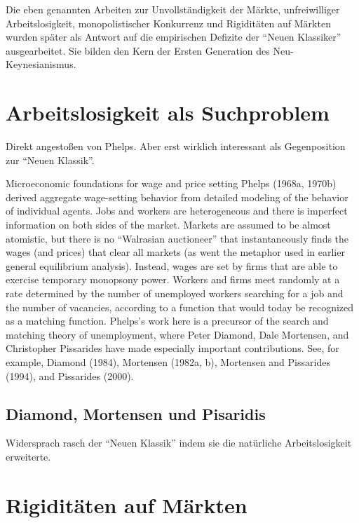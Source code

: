 Die eben genannten Arbeiten zur Unvollständigkeit der Märkte, unfreiwilliger Arbeitslosigkeit, monopolistischer Konkurrenz und Rigiditäten auf Märkten wurden später als Antwort auf die empirischen Defizite der "`Neuen Klassiker"' ausgearbeitet. Sie bilden den Kern der Ersten Generation des Neu-Keynesianismus.

\section{Arbeitslosigkeit als Suchproblem}
\label{Suchtheorie}

Direkt angestoßen von Phelps. Aber erst wirklich interessant als Gegenposition zur "`Neuen Klassik"'.
\textcite[S. 683]{Phelps1968}

Microeconomic foundations for wage and price setting
Phelps (1968a, 1970b) derived aggregate wage-setting behavior from detailed modeling of the 
behavior of individual agents. Jobs and workers are heterogeneous and there is imperfect 
information on both sides of the market. Markets are assumed to be almost atomistic, but there is 
no “Walrasian auctioneer” that instantaneously finds the wages (and prices) that clear all markets 
(as went the metaphor used in earlier general equilibrium analysis). Instead, wages are set by 
firms that are able to exercise temporary monopsony power. Workers and firms meet randomly 
at a rate determined by the number of unemployed workers searching for a job and the number of 
vacancies, according to a function that would today be recognized as a matching function. 
Phelps’s work here is a precursor of the search and matching theory of unemployment, where 
Peter Diamond, Dale Mortensen, and Christopher Pissarides have made especially important 
contributions. \parencite{Nobelpreis-Komitee2006}  See, for example, Diamond (1984), Mortensen (1982a, b), Mortensen and Pissarides (1994), and Pissarides 
(2000).


\subsection{Diamond, Mortensen und Pisaridis}

Widersprach rasch der "`Neuen Klassik"' indem sie die natürliche Arbeitslosigkeit erweiterte.


\section{Rigiditäten auf Märkten}
\label{Rigiditäten}

